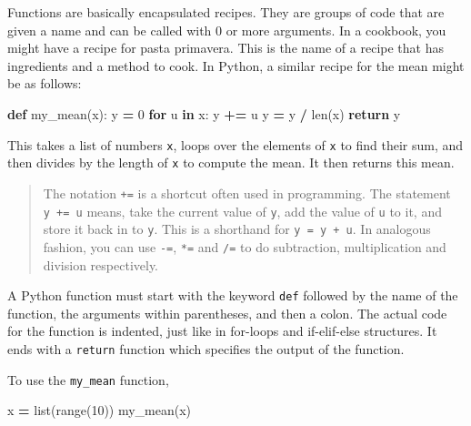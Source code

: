 \documentclass[
  letterpaper,
]{scrbook}
\newenvironment{Shaded}{\begin{snugshade}}{\end{snugshade}}
\newcommand{\BuiltInTok}[1]{#1}
\newcommand{\ControlFlowTok}[1]{\textcolor[rgb]{0.13,0.29,0.53}{\textbf{#1}}}
\newcommand{\DecValTok}[1]{\textcolor[rgb]{0.00,0.00,0.81}{#1}}
\newcommand{\KeywordTok}[1]{\textcolor[rgb]{0.13,0.29,0.53}{\textbf{#1}}}
\newcommand{\NormalTok}[1]{#1}
\newcommand{\OperatorTok}[1]{\textcolor[rgb]{0.81,0.36,0.00}{\textbf{#1}}}
\begin{document}
Functions are basically encapsulated recipes. They are groups of code that are given a name and can be called with 0 or more arguments. In a cookbook, you might have a recipe for pasta primavera. This is the name of a recipe that has ingredients and a method to cook. In Python, a similar recipe for the mean might be as follows:

\begin{Shaded}
\begin{Highlighting}[]
\KeywordTok{def}\NormalTok{ my\_mean(x):}
\NormalTok{    y }\OperatorTok{=} \DecValTok{0}
    \ControlFlowTok{for}\NormalTok{ u }\KeywordTok{in}\NormalTok{ x:}
\NormalTok{        y }\OperatorTok{+=}\NormalTok{ u }
\NormalTok{    y }\OperatorTok{=}\NormalTok{ y }\OperatorTok{/} \BuiltInTok{len}\NormalTok{(x)}
    \ControlFlowTok{return}\NormalTok{ y}
\end{Highlighting}
\end{Shaded}

This takes a list of numbers \texttt{x}, loops over the elements of \texttt{x} to find their sum, and then divides by the length of \texttt{x} to compute the mean. It then returns this mean.

\begin{quote}
The notation \texttt{+=} is a shortcut often used in programming. The statement \texttt{y\ +=\ u} means, take the current value of \texttt{y}, add the value of \texttt{u} to it, and store it back in to \texttt{y}. This is a shorthand for \texttt{y\ =\ y\ +\ u}. In analogous fashion, you can use \texttt{-=}, \texttt{*=} and \texttt{/=} to do subtraction, multiplication and division respectively.
\end{quote}

A Python function must start with the keyword \texttt{def} followed by the name of the function, the arguments within parentheses, and then a colon. The actual code for the function is indented, just like in for-loops and if-elif-else structures. It ends with a \texttt{return} function which specifies the output of the function.

To use the \texttt{my\_mean} function,

\begin{Shaded}
\begin{Highlighting}[]
\NormalTok{x }\OperatorTok{=} \BuiltInTok{list}\NormalTok{(}\BuiltInTok{range}\NormalTok{(}\DecValTok{10}\NormalTok{))}
\NormalTok{my\_mean(x)}
\end{Highlighting}
\end{Shaded}
\end{document}
